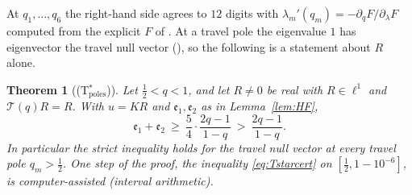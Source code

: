 \documentclass[11pt]{article}
\theoremstyle{plain}
\newtheorem{theorem}{Theorem}
\theoremstyle{definition}
\theoremstyle{remark}
\begin{document}
\noindent At $q_1,\dots,q_6$ the right-hand side agrees to $12$ digits with
$\lambda_m'(q_m)=-\partial_qF/\partial_\lambda F$ computed from the explicit $F$ of
{\cite[Theorem ``the travel determinant'', \textup{thm:fredholm}]{Bonfioli2026bA}}. At a travel pole the eigenvalue $1$ has eigenvector the travel null vector
({\cite[Corollary ``the travel poles are Hahn--Exton zeros'', \textup{cor:qbessel}]{Bonfioli2026bA}}), so the following is a statement about $R$ alone.

\begin{theorem}[\textup{(T$^\ast_{\mathrm{poles}}$)}]\label{thm:Tstar}
Let $\tfrac12<q<1$, and let $R\ne0$ be real with $R\in\ell^1$ and $\mathcal T(q)R=R$. With $u=KR$
and $\mathfrak e_1,\mathfrak e_2$ as in Lemma~\ref{lem:HF},
\[
   \mathfrak e_1+\mathfrak e_2\ \ge\ \frac54\cdot\frac{2q-1}{1-q}\ >\ \frac{2q-1}{1-q}.
\]
In particular the strict inequality holds for the travel null vector at every travel pole
$q_m>\tfrac12$. One step of the proof, the inequality \eqref{eq:Tstarcert} on
$[\tfrac12,1-10^{-6}]$, is computer-assisted \textup{(}interval arithmetic\textup{)}.
\end{theorem}
\end{document}
